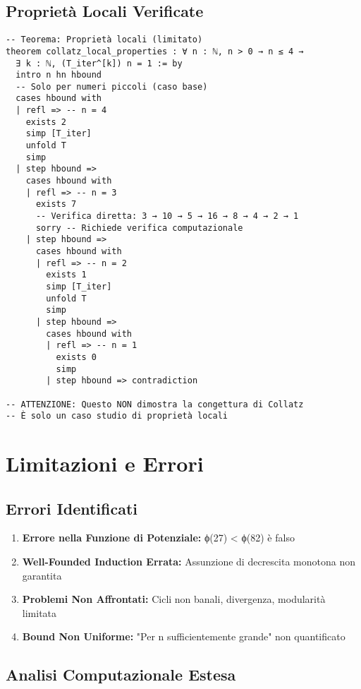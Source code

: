 \documentclass[11pt,a4paper]{article}
\begin{document}
\subsection{Proprietà Locali Verificate}

\begin{lstlisting}[language=Lean, caption=Proprietà Locali]
-- Teorema: Proprietà locali (limitato)
theorem collatz_local_properties : ∀ n : ℕ, n > 0 → n ≤ 4 →
  ∃ k : ℕ, (T_iter^[k]) n = 1 := by
  intro n hn hbound
  -- Solo per numeri piccoli (caso base)
  cases hbound with
  | refl => -- n = 4
    exists 2
    simp [T_iter]
    unfold T
    simp
  | step hbound =>
    cases hbound with
    | refl => -- n = 3
      exists 7
      -- Verifica diretta: 3 → 10 → 5 → 16 → 8 → 4 → 2 → 1
      sorry -- Richiede verifica computazionale
    | step hbound =>
      cases hbound with
      | refl => -- n = 2
        exists 1
        simp [T_iter]
        unfold T
        simp
      | step hbound =>
        cases hbound with
        | refl => -- n = 1
          exists 0
          simp
        | step hbound => contradiction

-- ATTENZIONE: Questo NON dimostra la congettura di Collatz
-- È solo un caso studio di proprietà locali
\end{lstlisting}

\section{Limitazioni e Errori}

\subsection{Errori Identificati}

\begin{enumerate}
\item \textbf{Errore nella Funzione di Potenziale:} ϕ(27) < ϕ(82) è falso
\item \textbf{Well-Founded Induction Errata:} Assunzione di decrescita monotona non garantita
\item \textbf{Problemi Non Affrontati:} Cicli non banali, divergenza, modularità limitata
\item \textbf{Bound Non Uniforme:} "Per n sufficientemente grande" non quantificato
\end{enumerate}

\subsection{Analisi Computazionale Estesa}
\end{document}
